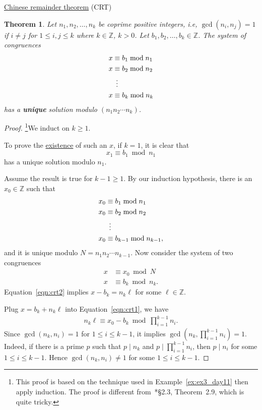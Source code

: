 \documentclass{amsbook}
\theoremstyle{plain}
\newtheorem{theorem}{Theorem}[chapter] %
\theoremstyle{definition}
\theoremstyle{remark}
\numberwithin{equation}{chapter}
\numberwithin{figure}{chapter}
\newcommand{\Z}{\mathbb{Z}}
\begin{document}
\underline{Chinese remainder theorem} (CRT)
\begin{theorem}
  Let $n_1, n_2, \ldots, n_k$ be coprime positive integers, i.e, $\gcd (n_i, n_j) = 1$ if $i \neq j$ for $1 \leqslant i, j \leqslant k$ where $k \in \Z$, $k > 0$. Let $b_1, b_2, \ldots, b_k \in \Z$. The system of congruences
  \begin{align}
    x &\equiv b_1 \bmod n_1 \\
    x &\equiv b_2 \bmod n_2 \\
    & \hspace{1.7mm} \vdots \\
    x &\equiv b_k \bmod n_k
  \end{align}
  has a \textbf{unique} solution modulo $(n_1n_2 \cdots n_k)$.
\end{theorem}
\begin{proof}\footnote{This proof is based on the technique used in Example~\ref{ex:ex3_day11} then apply induction. The proof is different from~\cite{Strayer2001}*{\S 2.3, Theorem~2.9}, which is quite tricky.}We induct on $k \geqslant 1$. 

To prove the \underline{existence} of such an $x$, if $k = 1$, it is clear that
  \[
    x_1 \equiv b_1 \bmod n_1     
  \]
  has a unique solution modulo $n_1$.

  Assume the result is true for $k - 1 \geqslant 1$. By our induction hypothesis, there is an $x_0 \in \Z$ such that
    \begin{align}
    x_0 &\equiv b_1 \bmod n_1 \\
    x_0 &\equiv b_2 \bmod n_2 \\
    & \hspace{1.7mm} \vdots \\
    x_0 &\equiv b_{k-1} \bmod n_{k-1} ,
  \end{align}
  and it is unique modulo $N = n_1n_2 \cdots n_{k-1}$. Now consider the system of two congruences
    \begin{align}
\label{eqn:crt1}      x &\equiv x_0 \bmod N \\
\label{eqn:crt2}      x &\equiv b_k \bmod n_k .
    \end{align}
    Equation~\eqref{eqn:crt2} implies $x - b_k = n_k \ell$ for some $\ell \in \Z$. 

    Plug $x = b_k + n_k \ell$ into Equation~\eqref{eqn:crt1}, we have 
    \begin{align}
\label{eqn:crt3}      n_k \ell \equiv x_0 - b_k \bmod \prod_{i=1}^{k-1} n_i .
    \end{align}
    Since $\gcd (n_k, n_i) = 1$ for $1 \leqslant i \leqslant k-1$, it implies $\gcd (n_k, \prod_{i=1}^{k-1} n_i) = 1$. Indeed, if there is a prime $p$ such that $p \mid n_k$ and $p \mid \prod_{i=1}^{k-1} n_i$, then $p \mid n_i$ for some $1 \leqslant i \leqslant k-1$. Hence $\gcd(n_k, n_i) \neq 1$ for some $1 \leqslant i \leqslant k-1$.


\end{proof}
\end{document}
